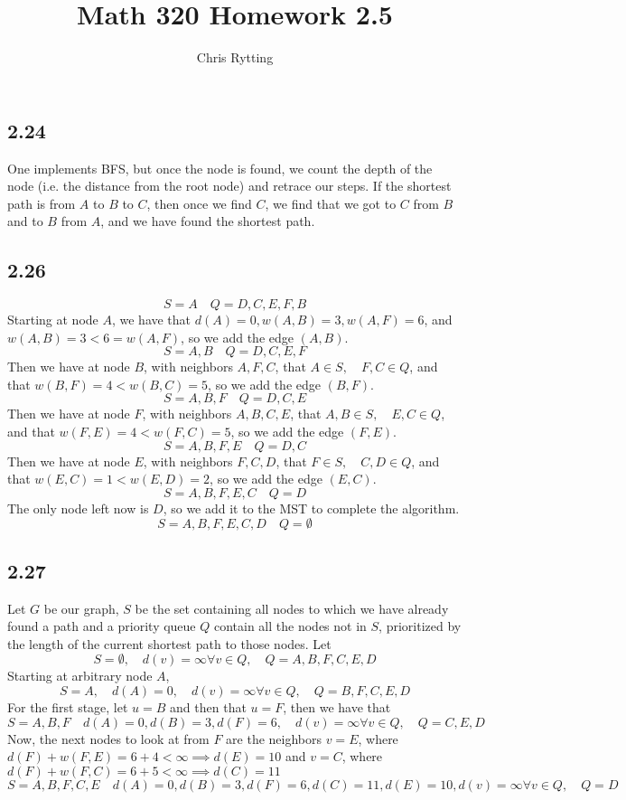 \documentclass[letterpaper,12pt]{article}
\theoremstyle{definition}
\begin{document}
\title{Math 320 Homework 2.5}
\author{Chris Rytting}
\maketitle

\subsection*{2.24}
One implements BFS, but once the node is found, we count the depth of the node (i.e. the distance from the root node) and retrace our steps. If the shortest path is from $A$ to $B$ to $C$, then once we find $C$, we find that we got to $C$ from $B$ and to $B$ from $A$, and we have found the shortest path.

\subsection*{2.26}
\[S = {A}\quad Q = {D,C, E, F, B}\]
Starting at node $A$, we have that $d(A) = 0, w(A,B) = 3, w(A,F) = 6$, and $w(A,B) = 3<6 = w(A,F)$, so we add the edge $(A,B)$.
\[S = {A,B}\quad Q = {D,C, E, F}\]
Then we have at node $B$, with neighbors $A,F,C$, that $A \in S, \quad F,C \in Q$, and that $w(B,F) = 4 < w(B,C) = 5$, so we add the edge $(B,F)$.
\[S = {A,B,F}\quad Q = {D,C, E}\]
Then we have at node $F$, with neighbors $A,B,C,E$, that $A,B \in S, \quad E,C \in Q$, and that $w(F,E) = 4 < w(F,C) = 5$, so we add the edge $(F,E)$.
\[S = {A,B,F,E}\quad Q = {D,C}\]
Then we have at node $E$, with neighbors $F,C,D$, that $F \in S, \quad C,D \in Q$, and that $w(E,C) = 1 < w(E,D) = 2$, so we add the edge $(E,C)$.
\[S = {A,B,F,E,C}\quad Q = {D}\]
The only node left now is $D$, so we add it to the MST to complete the algorithm.
\[S = {A,B,F,E,C,D}\quad Q = \emptyset\]


\subsection*{2.27}
Let $G$ be our graph, $S$ be the set containing all nodes to which we have already found a path and a priority queue $Q$ contain all the nodes not in $S$, prioritized by the length of the current shortest path to those nodes. Let 
\[ S = \emptyset, \quad d(v) = \infty \forall v\in Q, \quad Q = A,B,F,C,E,D\]
Starting at arbitrary node $A$,
\[ S = A, \quad d(A) = 0,\quad d(v) = \infty \forall v\in Q, \quad Q = B,F,C,E,D\]
For the first stage, let $u = B$ and then that $u = F$, then we have that
\[ S = A,B,F \quad d(A) = 0, d(B) = 3,d(F) = 6,\quad d(v) = \infty \forall v\in Q,\quad Q = C,E,D\]
Now, the next nodes to look at from $F$ are the neighbors $v=E$, where $d(F) + w(F,E) = 6+4 < \infty \implies d(E) = 10$
and $v=C$, where $d(F) + w(F,C) = 6+5 < \infty \implies d(C) = 11$
\[ S = A,B,F,C,E \quad d(A) = 0,d(B) = 3,d(F) = 6, d(C) = 11, d(E) = 10, d(v) = \infty \forall v\in Q, \quad Q = D\]
\end{document}
